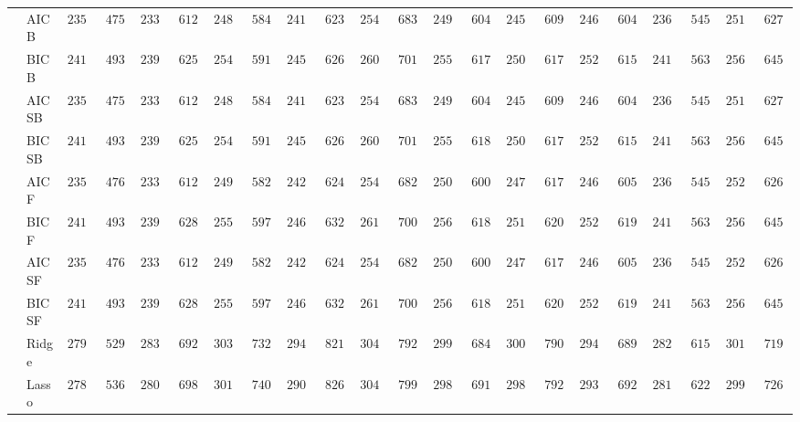 \begin{tabular}{p{0.2cm}p{1cm}|p{0.6cm}p{0.6cm}|p{0.6cm}p{0.6cm}p{0.6cm}p{0.6cm}p{0.6cm}p{0.6cm}|p{0.6cm}p{0.6cm}p{0.6cm}p{0.6cm}p{0.6cm}p{0.6cm}|p{0.6cm}p{0.6cm}p{0.6cm}p{0.6cm}p{0.6cm}p{0.6cm}}
 & AIC B  & $2356.52$ & $475.66$ & $2337.63$ & $612.63$ & $2488.15$ & $584.03$ & $2413.01$ & $623.12$ & $2547.33$ & $683.64$ & $2497.03$ & $604.05$ & $2454.05$ & $609.71$ & $2463.47$ & $604.90$ & $2361.68$ & $545.17$ & $2513.98$ & $627.64$ \\
 & BIC B  & $2413.76$ & $493.67$ & $2393.08$ & $625.02$ & $2549.08$ & $591.97$ & $2458.09$ & $626.63$ & $2609.52$ & $701.23$ & $2558.66$ & $617.59$ & $2508.61$ & $617.22$ & $2524.09$ & $615.35$ & $2411.66$ & $563.39$ & $2562.51$ & $645.36$ \\
 & AIC SB  & $2356.52$ & $475.66$ & $2337.63$ & $612.63$ & $2488.15$ & $584.03$ & $2413.01$ & $623.12$ & $2546.76$ & $683.47$ & $2497.03$ & $604.05$ & $2454.05$ & $609.71$ & $2463.47$ & $604.90$ & $2361.68$ & $545.17$ & $2513.98$ & $627.64$ \\
 & BIC SB  & $2413.76$ & $493.67$ & $2393.08$ & $625.02$ & $2549.08$ & $591.97$ & $2458.09$ & $626.63$ & $2609.52$ & $701.23$ & $2558.15$ & $618.16$ & $2508.61$ & $617.22$ & $2524.09$ & $615.35$ & $2411.66$ & $563.39$ & $2562.51$ & $645.36$ \\
 & AIC F  & $2357.92$ & $476.79$ & $2339.22$ & $612.80$ & $2493.90$ & $582.91$ & $2422.56$ & $624.65$ & $2549.35$ & $682.70$ & $2503.46$ & $600.41$ & $2475.68$ & $617.91$ & $2467.21$ & $605.20$ & $2367.67$ & $545.16$ & $2528.58$ & $626.87$ \\
 & BIC F  & $2413.76$ & $493.67$ & $2396.27$ & $628.23$ & $2557.38$ & $597.35$ & $2469.35$ & $632.08$ & $2610.98$ & $700.64$ & $2562.40$ & $618.59$ & $2517.49$ & $620.86$ & $2528.74$ & $619.50$ & $2414.12$ & $563.66$ & $2568.91$ & $645.60$ \\
 & AIC SF  & $2357.92$ & $476.79$ & $2339.22$ & $612.80$ & $2494.09$ & $582.73$ & $2422.56$ & $624.65$ & $2549.35$ & $682.70$ & $2503.96$ & $600.60$ & $2476.62$ & $617.68$ & $2467.47$ & $605.34$ & $2367.67$ & $545.16$ & $2529.03$ & $626.85$ \\
 & BIC SF  & $2413.76$ & $493.67$ & $2396.27$ & $628.23$ & $2557.38$ & $597.35$ & $2469.35$ & $632.08$ & $2610.98$ & $700.64$ & $2562.40$ & $618.59$ & $2517.49$ & $620.86$ & $2528.74$ & $619.50$ & $2414.12$ & $563.66$ & $2568.91$ & $645.60$ \\
 & Ridge  & $2795.38$ & $529.90$ & $2830.29$ & $692.81$ & $3038.70$ & $732.88$ & $2944.29$ & $821.55$ & $3048.87$ & $792.26$ & $2999.89$ & $684.73$ & $3008.49$ & $790.88$ & $2942.85$ & $689.35$ & $2825.52$ & $615.43$ & $3011.06$ & $719.21$ \\
 & Lasso  & $2781.75$ & $536.48$ & $2809.82$ & $698.72$ & $3015.88$ & $740.48$ & $2906.39$ & $826.43$ & $3041.13$ & $799.12$ & $2984.55$ & $691.05$ & $2982.37$ & $792.29$ & $2932.77$ & $692.88$ & $2812.83$ & $622.33$ & $2998.01$ & $726.67$ \\

\end{tabular}
